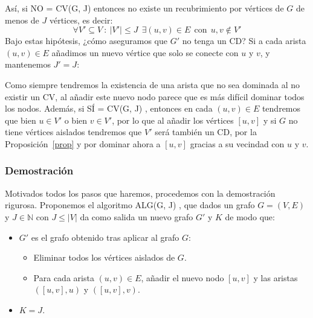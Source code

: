 \documentclass[12pt]{article}
\newcommand{\CV}{CV(G, J) }
\newcommand{\ALG}{ALG(G, J) }
\begin{document}
    \noindent
    Así, si NO = \CV entonces no existe un recubrimiento por vértices de $G$ de menos de $J$ vértices, es decir:
    \begin{equation*}
        \forall V'\subseteq V ~:~ |V'| \leq J ~~\exists (u,v)\in E~~\text{con}~~u,v\notin V'
    \end{equation*}
    Bajo estas hipótesis, ¿cómo aseguramos que $G'$ no tenga un CD? Si a cada arista $(u,v)\in E$ añadimos un nuevo vértice que solo se conecte con $u$ y $v$, y mantenemos $J' = J$:
    \begin{figure}[H]
        \centering
    \end{figure}

    \noindent
    Como siempre tendremos la existencia de una arista que no sea dominada al no existir un CV, al añadir este nuevo nodo parece que es más difícil dominar todos los nodos. Además, si SÍ = \CV, entonces en cada $(u,v)\in E$ tendremos que bien $u\in V'$ o bien $v\in V'$, por lo que al añadir los vértices $[u,v]$ y si $G$ no tiene vértices aislados tendremos que $V'$ será también un CD, por la Proposición~\ref{prop} y por dominar ahora a $[u,v]$ gracias a su vecindad con $u$ y $v$.

    \subsubsection{Demostración}
    \noindent
    Motivados todos los pasos que haremos, procedemos con la demostración rigurosa. Proponemos el algoritmo \ALG, que dados un grafo $G = (V,E)$ y $J\in \mathbb{N}$ con $J\leq |V|$ da como salida un nuevo grafo $G'$ y $K$ de modo que:
    \begin{itemize}
        \item $G'$ es el grafo obtenido tras aplicar al grafo $G$:
            \begin{itemize}
                \item Eliminar todos los vértices aislados de $G$.
                \item Para cada arista $(u,v)\in E$, añadir el nuevo nodo $[u,v]$ y las aristas $([u,v],u)$ y $([u,v],v)$.
            \end{itemize}
        \item $K = J$.
    \end{itemize}
\end{document}

